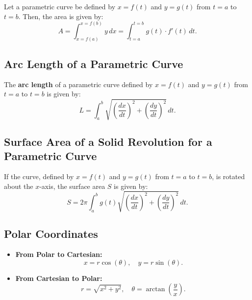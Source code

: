 \documentclass[a4paper,11pt]{article}
\begin{document}
\begin{tcolorbox}
    Let a parametric curve be defined by $x=f(t)$ and $y=g(t)$ from $t=a$ to $t=b$. Then, the area is given by:
    \[
    A = \int_{x=f(a)}^{x=f(b)} y \, dx = \int_{t=a}^{t=b} g(t) \cdot f'(t) \, dt.
    \]
\end{tcolorbox}




\subsection{Arc Length of a Parametric Curve}

\begin{tcolorbox}
    The \textbf{arc length} of a parametric curve defined by $x=f(t)$ and $y=g(t)$ from $t=a$ to $t=b$ is given by:
    \[
    L = \int_{a}^{b} \sqrt{\left( \frac{dx}{dt} \right)^2 + \left( \frac{dy}{dt} \right)^2} \, dt.
    \]
\end{tcolorbox}




\subsection{Surface Area of a Solid Revolution for a Parametric Curve}

\begin{tcolorbox}
    If the curve, defined by $x=f(t)$ and $y=g(t)$ from $t=a$ to $t=b$, is rotated about the $x$-axis, the surface area $S$ is given by:
    \[
    S = 2\pi \int_{a}^b g(t) \sqrt{\left( \frac{dx}{dt} \right)^2 + \left( \frac{dy}{dt} \right)^2} \, dt.
    \]
\end{tcolorbox}




\subsection{Polar Coordinates}

\begin{tcolorbox}
    \begin{itemize}
        \item \textbf{From Polar to Cartesian:}
        \[
        x = r \cos{(\theta)}, \quad y = r \sin{(\theta)}.
        \]
        \item \textbf{From Cartesian to Polar:}
        \[
        r = \sqrt{x^2 +y^2}, \quad \theta = \arctan{\left(\frac{y}{x} \right)}.
        \]
    \end{itemize}
\end{tcolorbox}
\end{document}
